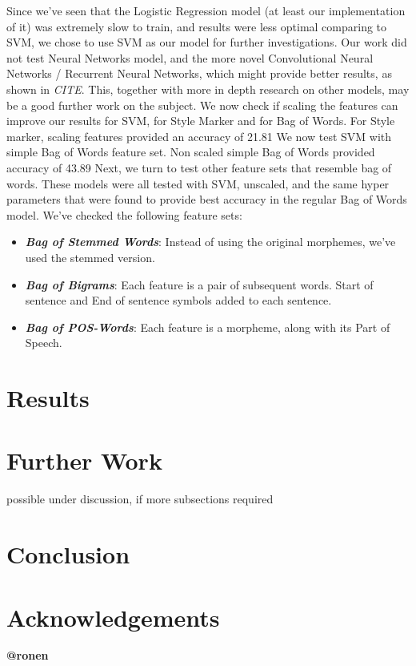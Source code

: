 \documentclass[a4paper]{article}
\begin{document}
Since we've seen that the Logistic Regression model (at least our implementation of it) was extremely slow to train, and results were less optimal comparing to SVM, we chose to use SVM as our model for further investigations.
Our work did not test Neural Networks model, and the more novel Convolutional Neural Networks / Recurrent Neural Networks, which might provide better results, as shown in \emph{CITE}. This, together with more in depth research on other models, may be a good further work on the subject.
We now check if scaling the features can improve our results for SVM, for Style Marker and for Bag of Words.
For Style marker, scaling features provided an accuracy of 21.81%
We now test SVM with simple Bag of Words feature set.
Non scaled simple Bag of Words provided accuracy of 43.89%
Next, we turn to test other feature sets that resemble bag of words. These models were all tested with SVM, unscaled, and the same hyper parameters that were found to provide best accuracy in the regular Bag of Words model. We've checked the following feature sets:
\begin{itemize}
\item \textbf{\emph{Bag of Stemmed Words}}: Instead of using the original morphemes, we've used the stemmed version.
\item \textbf{\emph{Bag of Bigrams}}: Each feature is a pair of subsequent words. Start of sentence and End of sentence symbols added to each sentence.
\item \textbf{\emph{Bag of POS-Words}}: Each feature is a morpheme, along with its Part of Speech.
\end{itemize}
\section{Results}
\label{Results}
\section{Further Work}
\label{Further Work}
possible under discussion, if more subsections required
\section{Conclusion}
\label{Conclusion}
\section{Acknowledgements}
\label{Acknowledgements}
\textbf{@ronen}\\
\end{document}
